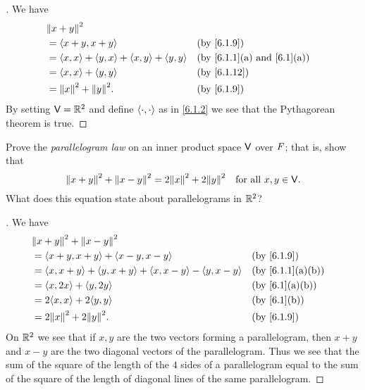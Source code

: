 \begin{proof}[]
  We have
  \begin{align*}
     & \norm{x + y}^2                                                                                         \\
     & = \inn{x + y, x + y}                                &  & \text{(by \cref{6.1.9})}                      \\
     & = \inn{x, x} + \inn{y, x} + \inn{x, y} + \inn{y, y} &  & \text{(by \cref{6.1.1}(a) and \cref{6.1}(a))} \\
     & = \inn{x, x} + \inn{y, y}                           &  & \text{(by \cref{6.1.12})}                     \\
     & = \norm{x}^2 + \norm{y}^2.                          &  & \text{(by \cref{6.1.9})}
  \end{align*}
  By setting \(\mathsf{V} = \mathbb{R}^2\) and define \(\left\langle\cdot, \cdot\right\rangle\) as in \cref{6.1.2} we see that the Pythagorean theorem is true.
\end{proof}

\begin{ex}\label{ex:6.1.11}
  Prove the \emph{parallelogram law} on an inner product space \(\mathsf{V}\) over \(\mathit{F}\);
  that is, show that
  \[
    \norm{x + y}^2 + \norm{x - y}^2 = 2 \norm{x}^2 + 2 \norm{y}^2 \quad \text{for all } x, y \in \V.
  \]
  What does this equation state about parallelograms in \(\mathbb{R}^2\)?
\end{ex}

\begin{proof}[]
  We have
  \begin{align*}
     & \norm{x + y}^2 + \norm{x - y}^2                                                                         \\
     & = \inn{x + y, x + y} + \inn{x - y, x - y}                           &  & \text{(by \cref{6.1.9})}       \\
     & = \inn{x, x + y} + \inn{y, x + y} + \inn{x, x - y} - \inn{y, x - y} &  & \text{(by \cref{6.1.1}(a)(b))} \\
     & = \inn{x, 2x} + \inn{y, 2y}                                         &  & \text{(by \cref{6.1}(a)(b))}   \\
     & = 2 \inn{x, x} + 2 \inn{y, y}                                       &  & \text{(by \cref{6.1}(b))}      \\
     & = 2 \norm{x}^2 + 2 \norm{y}^2.                                      &  & \text{(by \cref{6.1.9})}
  \end{align*}
  On \(\mathbb{R}^2\) we see that if \(x, y\) are the two vectors forming a parallelogram, then \(x + y\) and \(x - y\) are the two diagonal vectors of the parallelogram.
  Thus we see that the sum of the square of the length of the \(4\) sides of a parallelogram equal to the sum of the square of the length of diagonal lines of the same parallelogram.
\end{proof}

\begin{ex}\label{ex:6.1.15}

\end{ex}

